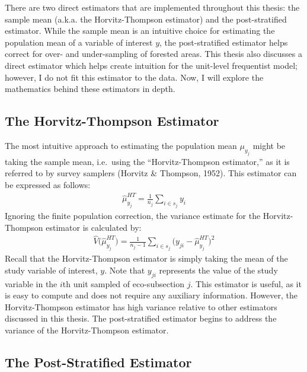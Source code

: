 \documentclass[12pt,twoside]{reedthesis}
\begin{document}
There are two direct estimators that are implemented throughout this thesis: the sample mean (a.k.a. the Horvitz-Thompson estimator) and the post-stratified estimator. While the sample mean is an intuitive choice for estimating the population mean of a variable of interest \(y\), the post-stratified estimator helps correct for over- and under-sampling of forested areas. This thesis also discusses a direct estimator which helps create intuition for the unit-level frequentist model; however, I do not fit this estimator to the data. Now, I will explore the mathematics behind these estimators in depth.

\hypertarget{the-horvitz-thompson-estimator}{%
\subsection{The Horvitz-Thompson Estimator}\label{the-horvitz-thompson-estimator}}

The most intuitive approach to estimating the population mean \(\mu_{y_j}\) might be taking the sample mean, i.e.~using the ``Horvitz-Thompson estimator,'' as it is referred to by survey samplers (Horvitz \& Thompson, 1952). This estimator can be expressed as follows:
\begin{align}
\hat\mu_{y_j}^{HT} = \frac{1}{n_j} \sum_{i \in s_j} y_i
\end{align}
Ignoring the finite population correction, the variance estimate for the Horvitz-Thompson estimator is calculated by:
\begin{align}
\hat V\Big(\hat\mu_{y_j}^{HT}\Big) = \frac{1}{n_j-1} \sum_{i \in s_j} \Big(y_{ji} - \hat\mu_{y_j}^{HT}\Big)^2
\end{align}
Recall that the Horvitz-Thompson estimator is simply taking the mean of the study variable of interest, \(y\). Note that \(y_{ji}\) represents the value of the study variable in the \(i\)th unit sampled of eco-subsection \(j\). This estimator is useful, as it is easy to compute and does not require any auxiliary information. However, the Horvitz-Thompson estimator has high variance relative to other estimators discussed in this thesis. The post-stratified estimator begins to address the variance of the Horvitz-Thompson estimator.

\hypertarget{the-post-stratified-estimator}{%
\subsection{The Post-Stratified Estimator}\label{the-post-stratified-estimator}}
\end{document}
